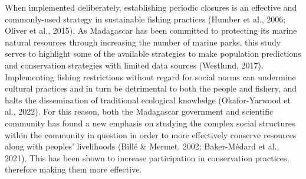 \documentclass[
]{article}
\begin{document}
When implemented deliberately, establishing periodic closures is an effective and commonly-used strategy in sustainable fishing practices (Humber et al., 2006; Oliver et al., 2015). As Madagascar has been committed to protecting its marine natural resources through increasing the number of marine parks, this study serves to highlight some of the available strategies to make population predictions and conservation strategies with limited data sources (Westlund, 2017). Implementing fishing restrictions without regard for social norms can undermine cultural practices and in turn be detrimental to both the people and fishery, and halts the dissemination of traditional ecological knowledge (Okafor-Yarwood et al., 2022). For this reason, both the Madagascar government and scientific community has found a new emphasis on studying the complex social structures within the community in question in order to more effectively conserve resources along with peoples' livelihoods (Billé \& Mermet, 2002; Baker-Médard et al., 2021). This has been shown to increase participation in conservation practices, therefore making them more effective.
\end{document}
